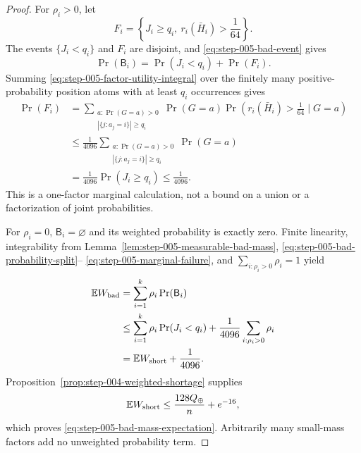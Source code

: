 \begin{proof}
For \(\rho_i>0\), let
\begin{equation}\label{eq:step-005-no-shortage-failure}
F_i=\left\{J_i\ge q_i,\ r_i(\bar H_i)>\frac1{64}\right\}.
\end{equation}
The events \(\{J_i<q_i\}\) and \(F_i\) are disjoint, and
\eqref{eq:step-005-bad-event} gives
\begin{equation}\label{eq:step-005-bad-probability-split}
\Pr(\mathsf B_i)=\Pr(J_i<q_i)+\Pr(F_i).
\end{equation}
Summing \eqref{eq:step-005-factor-utility-integral} over the finitely many
positive-probability position atoms with at least \(q_i\) occurrences
gives
\begin{equation}\label{eq:step-005-marginal-failure}
\begin{split}
\Pr(F_i)
&=\sum_{\substack{a:\Pr(G=a)>0\\
                   |\{j:a_j=i\}|\ge q_i}}
  \Pr(G=a)
  \Pr\!\left(r_i(\bar H_i)>\frac1{64}\mid G=a\right)\\
&\le\frac1{4096}
  \sum_{\substack{a:\Pr(G=a)>0\\
                   |\{j:a_j=i\}|\ge q_i}}
  \Pr(G=a)\\
&=\frac1{4096}\Pr(J_i\ge q_i)
\le\frac1{4096}.
\end{split}
\end{equation}
This is a one-factor marginal calculation, not a bound on a union or a
factorization of joint probabilities.

For \(\rho_i=0\), \(\mathsf B_i=\varnothing\) and its weighted
probability is exactly zero.  Finite linearity, integrability from
Lemma~\ref{lem:step-005-measurable-bad-mass},
\eqref{eq:step-005-bad-probability-split}--
\eqref{eq:step-005-marginal-failure}, and
\(\sum_{i:\rho_i>0}\rho_i=1\) yield
\begin{equation}\label{eq:step-005-bad-versus-short}
\begin{split}
\mathbb EW_{\rm bad}
&=\sum_{i=1}^k\rho_i\Pr(\mathsf B_i)\\
&\le\sum_{i=1}^k\rho_i\Pr(J_i<q_i)
 +\frac1{4096}\sum_{i:\rho_i>0}\rho_i\\
&=\mathbb EW_{\rm short}+\frac1{4096}.
\end{split}
\end{equation}
Proposition~\ref{prop:step-004-weighted-shortage} supplies
\[
\mathbb EW_{\rm short}
\le\frac{128Q_\oplus}{n}+e^{-16},
\]
which proves \eqref{eq:step-005-bad-mass-expectation}.  Arbitrarily many
small-mass factors add no unweighted probability term.
\end{proof}

